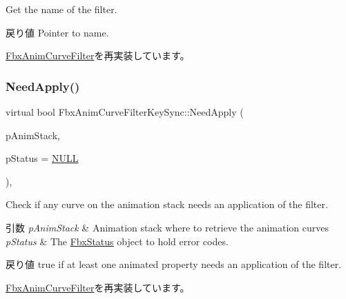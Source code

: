 Get the name of the filter. \begin{DoxyReturn}{戻り値}
Pointer to name. 
\end{DoxyReturn}


\hyperlink{class_fbx_anim_curve_filter_abd559d5052fbb072042e59241940a35c}{Fbx\+Anim\+Curve\+Filter}を再実装しています。

\mbox{\label{class_fbx_anim_curve_filter_key_sync_a987ccf74bf3bdf7828812067d895950c}} 
\subsubsection{\texorpdfstring{Need\+Apply()}{NeedApply()}\hspace{0.1cm}{\footnotesize\ttfamily [1/5]}}
{\footnotesize\ttfamily virtual bool Fbx\+Anim\+Curve\+Filter\+Key\+Sync\+::\+Need\+Apply (\begin{DoxyParamCaption}\item[{\hyperlink{class_fbx_anim_stack}{Fbx\+Anim\+Stack} $\ast$}]{p\+Anim\+Stack,  }\item[{\hyperlink{class_fbx_status}{Fbx\+Status} $\ast$}]{p\+Status = {\ttfamily \hyperlink{fbxarch_8h_a070d2ce7b6bb7e5c05602aa8c308d0c4}{N\+U\+LL}} }\end{DoxyParamCaption})\hspace{0.3cm}{\ttfamily [inline]}, {\ttfamily [virtual]}}

Check if any curve on the animation stack needs an application of the filter. 
\begin{DoxyParams}{引数}
{\em p\+Anim\+Stack} & Animation stack where to retrieve the animation curves \\
\hline
{\em p\+Status} & The \hyperlink{class_fbx_status}{Fbx\+Status} object to hold error codes. \\
\hline
\end{DoxyParams}
\begin{DoxyReturn}{戻り値}
{\ttfamily true} if at least one animated property needs an application of the filter. 
\end{DoxyReturn}


\hyperlink{class_fbx_anim_curve_filter_af95af2469851b88b4f6d38401ace5791}{Fbx\+Anim\+Curve\+Filter}を再実装しています。



